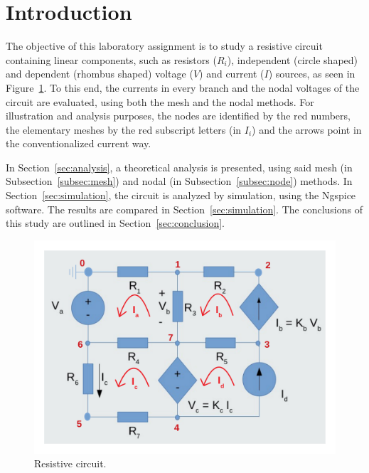 \section{Introduction}
\label{sec:introduction}

The objective of this laboratory assignment is to study a resistive circuit containing linear components, such as resistors ($R_i$), independent (circle shaped) and dependent (rhombus shaped) voltage ($V$) and current ($I$) sources, as seen in Figure~\ref{fig:esq}. To this end, the currents in every branch and the nodal voltages of the circuit are evaluated, using both the mesh and the nodal methods. For illustration and analysis purposes, the nodes are identified by the red numbers, the elementary meshes by the red subscript letters (in $I_i$) and the arrows point in the conventionalized current way.

In Section~\ref{sec:analysis}, a theoretical analysis is presented, using said mesh (in Subsection~\ref{subsec:mesh}) and nodal (in Subsection~\ref{subsec:node}) methods. In Section~\ref{sec:simulation}, the circuit is analyzed by simulation, using the Ngspice software.
The results are compared in Section~\ref{sec:simulation}. The conclusions of this study are outlined in
Section~\ref{sec:conclusion}.



\begin{figure}[h] \centering
\includegraphics[width=0.8\linewidth]{esq_circ.pdf}
\caption{Resistive circuit.}
\label{fig:esq}
\end{figure}

